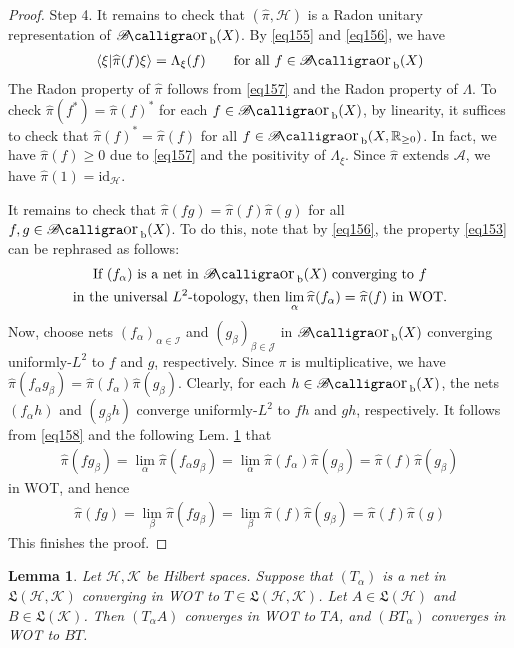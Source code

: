 \documentclass[12pt,b5paper,notitlepage]{article}
\theoremstyle{definition}
\theoremstyle{plain}
\newtheorem{lm}[df]{Lemma}
\DeclareMathOperator{\Borb}{{\mathscr{B}\text{\kern -2pt {\calligra\large or}}\,}_{\mathrm b}}
\newcommand{\fk}{\mathfrak}
\newcommand{\wht}{\widehat}
\newcommand{\id}{\mathrm{id}}
\newcommand{\bk}[1]{\langle {#1}\rangle}
\newcommand{\scr}{\mathscr}
\newcommand{\Rbb}{\mathbb R}
\newcommand{\MH}{\mathcal H}
\newcommand{\MK}{\mathcal K}
\numberwithin{equation}{section}
\begin{document}
\begin{proof}
Step 4. It remains to check that $(\wht\pi,\MH)$ is a Radon unitary representation of $\Borb(X)$. By \eqref{eq155} and \eqref{eq156}, we have
\begin{align}\label{eq157}
\bk{\xi|\wht\pi(f)\xi}=\Lambda_\xi(f)\qquad\text{for all }f\in\Borb(X)
\end{align}
The Radon property of $\wht\pi$ follows from \eqref{eq157} and the Radon property of $\Lambda$. To check $\wht\pi(f^*)=\wht\pi(f)^*$ for each $f\in\Borb(X)$, by linearity, it suffices to check that $\wht\pi(f)^*=\wht\pi(f)$ for all $f\in\Borb(X,\Rbb_{\geq0})$. In fact, we have $\wht\pi(f)\geq0$ due to \eqref{eq157} and the positivity of $\Lambda_\xi$. Since $\wht\pi$ extends $\scr A$, we have $\wht\pi(1)=\id_\MH$.

It remains to check that $\wht\pi(fg)=\wht\pi(f)\wht\pi(g)$ for all $f,g\in\Borb(X)$. To do this, note that by \eqref{eq156}, the property \eqref{eq153} can be rephrased as follows:
\begin{gather}\label{eq158}
\begin{gathered}
\text{If $(f_\alpha)$ is a net in $\Borb(X)$ converging to $f$}\\
\text{in the universal $L^2$-topology, then $\lim_\alpha\wht\pi(f_\alpha)=\wht\pi(f)$ in WOT.}
\end{gathered}
\end{gather}
Now, choose nets $(f_\alpha)_{\alpha\in\scr I}$ and $(g_\beta)_{\beta\in\scr J}$ in $\Borb(X)$ converging uniformly-$L^2$ to $f$ and $g$, respectively. Since $\pi$ is multiplicative, we have $\wht\pi(f_\alpha g_\beta)=\wht\pi(f_\alpha)\wht\pi(g_\beta)$. Clearly, for each $h\in\Borb(X)$, the nets $(f_\alpha h)$ and $(g_\beta h)$ converge uniformly-$L^2$ to $fh$ and $gh$, respectively. It follows from \eqref{eq158} and the following Lem. \ref{lb279} that
\begin{align*}
\wht\pi(fg_\beta)=\lim_\alpha \wht\pi(f_\alpha g_\beta)=\lim_\alpha\wht\pi(f_\alpha)\wht\pi(g_\beta)=\wht\pi(f)\wht\pi(g_\beta)
\end{align*}
in WOT, and hence
\begin{align*}
\wht\pi(fg)=\lim_\beta\wht\pi(fg_\beta)=\lim_\beta\wht\pi(f)\wht\pi(g_\beta)=\wht\pi(f)\wht\pi(g)
\end{align*}
This finishes the proof.
\end{proof}


\begin{lm}\label{lb279}
Let $\MH,\MK$ be Hilbert spaces. Suppose that $(T_\alpha)$ is a net in $\fk L(\MH,\MK)$ converging in WOT to $T\in\fk L(\MH,\MK)$. Let $A\in\fk L(\MH)$ and $B\in\fk L(\MK)$. Then $(T_\alpha A)$ converges in WOT to $TA$, and $(BT_\alpha)$ converges in WOT to $BT$.
\end{lm}
\end{document}
